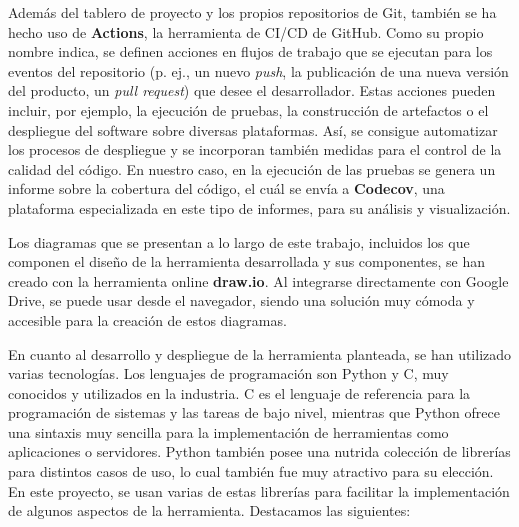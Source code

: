 Además del tablero de proyecto y los propios repositorios de Git, también se ha
hecho uso de \textbf{Actions}, la herramienta de CI/CD de GitHub. Como su propio
nombre indica, se definen acciones en flujos de trabajo que se ejecutan para los
eventos del repositorio (p. ej., un nuevo \textit{push}, la publicación de una
nueva versión del producto, un \textit{pull request}) que desee el
desarrollador. Estas acciones pueden incluir, por ejemplo, la ejecución de
pruebas, la construcción de artefactos o el despliegue del software sobre
diversas plataformas. Así, se consigue automatizar los procesos de despliegue y
se incorporan también medidas para el control de la calidad del código. En
nuestro caso, en la ejecución de las pruebas se genera un informe sobre la
cobertura del código, el cuál se envía a \textbf{Codecov}, una plataforma
especializada en este tipo de informes, para su análisis y visualización.

Los diagramas que se presentan a lo largo de este trabajo, incluidos los que
componen el diseño de la herramienta desarrollada y sus componentes, se han
creado con la herramienta online \textbf{draw.io}. Al integrarse directamente
con Google Drive, se puede usar desde el navegador, siendo una solución muy
cómoda y accesible para la creación de estos diagramas.

En cuanto al desarrollo y despliegue de la herramienta planteada, se han
utilizado varias tecnologías. Los lenguajes de programación son Python y C, muy
conocidos y utilizados en la industria. C es el lenguaje de referencia para la
programación de sistemas y las tareas de bajo nivel, mientras que Python ofrece
una sintaxis muy sencilla para la implementación de herramientas como
aplicaciones o servidores. Python también posee una nutrida colección de
librerías para distintos casos de uso, lo cual también fue muy atractivo para su
elección. En este proyecto, se usan varias de estas librerías para facilitar la
implementación de algunos aspectos de la herramienta. Destacamos las siguientes:


